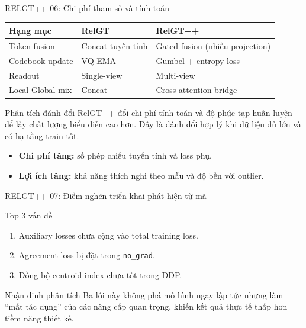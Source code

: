 \documentclass[aspectratio=169,11pt]{beamer}
\begin{document}
\begin{frame}{RELGT++-06: Chi phí tham số và tính toán}
  \begin{table}
    \centering
    \small
    \begin{tabular}{p{3.1cm}p{3.6cm}p{3.6cm}}
      \toprule
      Hạng mục & RelGT & RelGT++ \\
      \midrule
      Token fusion & Concat tuyến tính & Gated fusion (nhiều projection) \\
      Codebook update & VQ-EMA & Gumbel + entropy loss \\
      Readout & Single-view & Multi-view \\
      Local-Global mix & Concat & Cross-attention bridge \\
      \bottomrule
    \end{tabular}
  \end{table}
  \begin{block}{Phân tích đánh đổi}
    RelGT++ đổi chi phí tính toán và độ phức tạp huấn luyện để lấy chất lượng biểu diễn cao hơn. Đây là đánh đổi hợp lý khi dữ liệu đủ lớn và có hạ tầng train tốt.
  \end{block}
  \begin{itemize}
    \item \textbf{Chi phí tăng:} số phép chiếu tuyến tính và loss phụ.
    \item \textbf{Lợi ích tăng:} khả năng thích nghi theo mẫu và độ bền với outlier.
  \end{itemize}
\end{frame}

\begin{frame}{RELGT++-07: Điểm nghẽn triển khai phát hiện từ mã}
  \begin{alertblock}{Top 3 vấn đề}
    \begin{enumerate}
      \item Auxiliary losses chưa cộng vào total training loss.
      \item Agreement loss bị đặt trong \texttt{no\_grad}.
      \item Đồng bộ centroid index chưa tốt trong DDP.
    \end{enumerate}
  \end{alertblock}
  \begin{block}{Nhận định phân tích}
    Ba lỗi này không phá mô hình ngay lập tức nhưng làm “mất tác dụng” của các nâng cấp quan trọng, khiến kết quả thực tế thấp hơn tiềm năng thiết kế.
  \end{block}
\end{frame}
\end{document}
